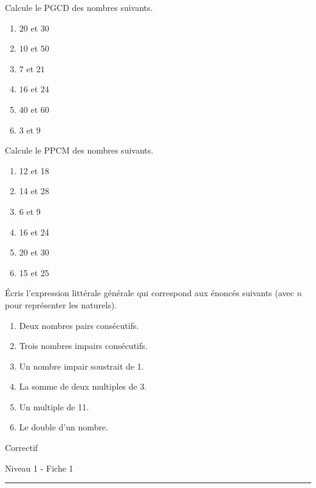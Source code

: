 \documentclass[12pt,parskip=half-, twoside=semi]{scrartcl}
\begin{document}
  \begin{exercise}
    Calcule le PGCD des nombres suivants.
  \begin{enumerate}[cols=3]
      \item \(20 \) et \( 30\)
      \item \(10 \) et \( 50\) 
      \item \(7 \) et \( 21\)
      \item \(16 \) et \( 24\)
      \item \(40 \) et \( 60\)
      \item \(3 \) et \( 9\)   
    \end{enumerate}
  \end{exercise}
  
  \begin{exercise}
    Calcule le PPCM des nombres suivants.
    \begin{enumerate}[cols=3]
      \item 12 et 18
      \item 14 et 28
      \item 6 et 9
      \item 16 et 24
      \item 20 et 30
      \item  15 et 25
    \end{enumerate}
  \end{exercise}
  
  \begin{exercise}
      Écris l'expression littérale générale qui correspond aux énoncés suivants (avec \(n\) pour représenter les naturels).
      \begin{enumerate}[cols=2]
          \item Deux nombres pairs consécutifs.
          \item Trois nombres impairs consécutifs.
          \item Un nombre impair soustrait de 1.
          \item La somme de deux multiples de 3.
          \item Un multiple de 11.
          \item Le double d'un nombre.
      \end{enumerate}
    \end{exercise}

\newpage
\begin{center}
  \bfseries
  \begin{Huge}
    Correctif
  \end{Huge}
  \smallbreak
  \begin{large}
    Niveau 1  - Fiche 1
  \end{large}
  \smallbreak
  \rule[10pt]{.5\linewidth}{1 pt}
\end{center}
\end{document}

